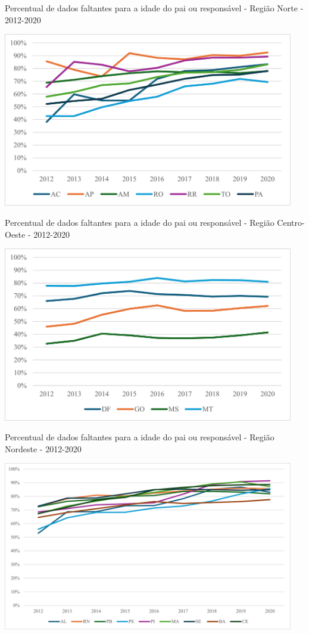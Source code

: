 \begin{grafico}
    \centering  
    \caption{Percentual de dados faltantes para a idade do pai ou responsável - Região Norte - 2012-2020}
           \includegraphics[width=5.0in]{imagens/faltantes-norte.pdf}
    \label{graf:norte}
\end{grafico}

\begin{grafico}
    \centering  
    \caption{Percentual de dados faltantes para a idade do pai ou responsável - Região Centro-Oeste - 2012-2020}
   \includegraphics[width=5.0in]{imagens/faltantes-centro-oeste.pdf}
    \label{graf:centro-oeste}
\end{grafico}

\begin{grafico}
    \centering  
    \caption{Percentual de dados faltantes para a idade do pai ou responsável - Região Nordeste - 2012-2020}
        \includegraphics[width=5.0in]{imagens/faltantes-nordeste.pdf}
    \label{graf:nordeste}
\end{grafico}

